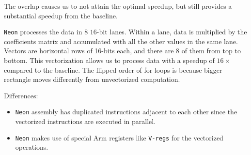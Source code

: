 \documentclass[
  course = {{ESE532 System-on-a-Chip}},
  quartile = {{}},
  assignment = 4,
  name = {{Sheil Sarda, Kate Ballard}},
  studentnumber = {{}},
  email = {{sheils@seas.upenn.edu, kballard@seas.upenn.edu}},
  firstexercise = 1
]{aga-homework}
\begin{document}
The overlap causes us to not attain the optimal speedup, but still provides a substantial speedup from the baseline.

\subexercise
\verb|Neon| processes the data in 8 $16$-bit lanes. Within a lane, data is multiplied by the coefficients matrix and accumulated with all the other values in the same lane.
Vectors are horizontal rows of 16-bits each, and there are 8 of them from top to bottom.
\newline
\newline
This vectorization allows us to process data with a speedup of $16\times$ compared to the baseline.
\newline
\newline
The flipped order of for loops is because bigger rectangle moves differently from unvectorized computation.

\subexercise
Differences:
\begin{itemize}
	\item \verb|Neon| assembly has duplicated instructions adjacent to each other since the vectorized instructions are executed in parallel.
	\item \verb|Neon| makes use of special Arm registers like \verb|V-regs| for the vectorized operations.
\end{itemize} 
\end{document}
